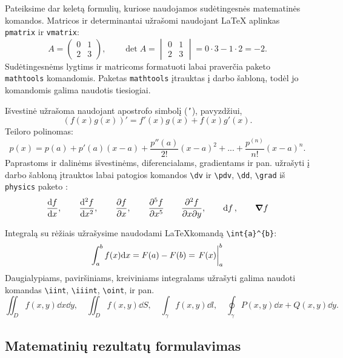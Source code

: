 \documentclass[]{VUMIFTemplateClass}
\begin{document}
\bigskip

Pateiksime dar keletą formulių, kuriose naudojamos sudėtingesnės matematinės komandos. Matricos ir determinantai užrašomi naudojant LaTeX aplinkas \texttt{pmatrix} ir \texttt{vmatrix}:
\[
A= \begin{pmatrix}
    0 & 1\\
    2 & 3
\end{pmatrix}, \qquad
\det A =
\begin{vmatrix}
0 & 1\\
2 & 3    
\end{vmatrix} = 0 \cdot 3 - 1 \cdot 2 = -2.
\]
Sudėtingesnėms lygtims ir matricoms formatuoti labai praverčia paketo \texttt{mathtools} \cite{mtoolsdoc} komandomis. Paketas \texttt{mathtools} įtrauktas į darbo šabloną, todėl jo komandomis galima naudotis tiesiogiai.

Išvestinė užrašoma naudojant apostrofo simbolį (\texttt{'}), pavyzdžiui,
\[
(f(x)g(x))' = f'(x)g(x) + f(x)g'(x).
\]
Teiloro polinomas:
\[
p(x) = p(a) + p'(a)(x-a)+\frac{p''(a)}{2!}(x-a)^2 + ... + \frac{p^{(n)}}{n!}(x-a)^n.
\]
Paprastoms ir dalinėms išvestinėms, diferencialams, gradientams ir pan. užrašyti į darbo šabloną įtrauktos labai patogios komandos \texttt{\textbackslash dv} ir \texttt{\textbackslash pdv}, \texttt{\textbackslash dd}, \texttt{\textbackslash grad} iš \texttt{physics} paketo \cite{physdoc}:
\[
\dv{f}{x},  \qquad
\dv[2]{f}{x}, \qquad
\pdv{f}{x},  \qquad
\pdv[5]{f}{x} \qquad
\pdv{f}{x}{y}, \qquad
\dd{f}, \qquad
\grad{f}
\]

Integralą su rėžiais užrašysime naudodami \LaTeX komandą \texttt{\textbackslash int\textunderscore \{a\}\^{}\{b\}}:
\[
\int_{a}^{b}f(x) \dd x = F(a) - F(b) = \eval{F(x)}_{a}^{b}
\]
Daugialypiams, paviršiniams, kreiviniams integralams užrašyti galima naudoti komandas \texttt{\textbackslash iint}, \texttt{\textbackslash iiint}, \texttt{\textbackslash oint}, ir pan.
\[
\iint_{D}f(x, y)\dd{x}\dd{y},\quad
\iint_{D} f(x,y)\dd{S}, \quad
\int_{\gamma} f(x,y)\dd{l},\quad
\oint_{\gamma} P(x,y)\dd{x}+Q(x,y)\dd{y}.
\]

\subsection{Matematinių rezultatų formulavimas}
\end{document}
